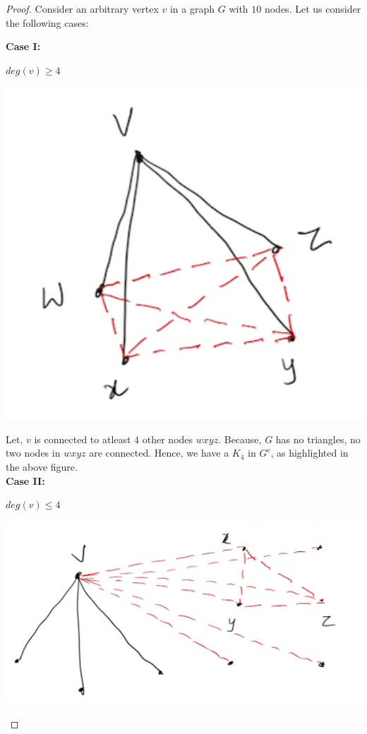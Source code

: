 \documentclass[12pt]{article}
\begin{document}
\begin{proof}
Consider an arbitrary vertex $v$ in a graph $G$ with $10$ nodes. Let us consider the following cases:

\textbf{Case I:}

$deg(v) \ge 4$

\begin{center}
\includegraphics[width=16cm, keepaspectratio]{3}
\end{center}

Let, $v$ is connected to atleast $4$ other nodes $wxyz$. Because, $G$ has no triangles, no two nodes in $wxyz$ are connected. Hence, we have a $K_4$ in $G^{c}$, as highlighted in the above figure.
\\

\textbf{Case II:}

$deg(v) \le 4$

\begin{center}
\includegraphics[width=16cm, keepaspectratio]{4}
\end{center}


\end{proof}
\end{document}
